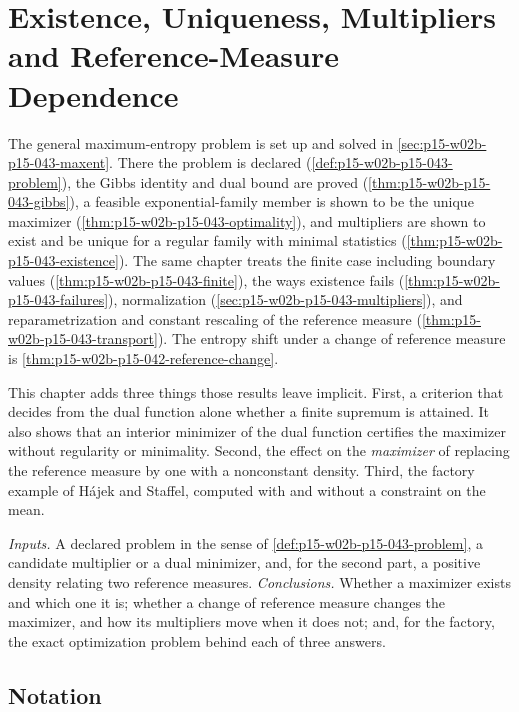 \chapter{Existence, Uniqueness, Multipliers and Reference-Measure Dependence}
\label{sec:p15-w02b-p15-044-maxent-existence}

The general maximum-entropy problem is set up and solved in
\cref{sec:p15-w02b-p15-043-maxent}. There the problem is declared
(\cref{def:p15-w02b-p15-043-problem}), the Gibbs identity and dual bound
are proved (\cref{thm:p15-w02b-p15-043-gibbs}), a feasible
exponential-family member is shown to be the unique maximizer
(\cref{thm:p15-w02b-p15-043-optimality}), and multipliers are shown to
exist and be unique for a regular family with minimal statistics
(\cref{thm:p15-w02b-p15-043-existence}). The same chapter treats the finite
case including boundary values (\cref{thm:p15-w02b-p15-043-finite}), the
ways existence fails (\cref{thm:p15-w02b-p15-043-failures}),
normalization (\cref{sec:p15-w02b-p15-043-multipliers}), and
reparametrization and constant rescaling of the reference measure
(\cref{thm:p15-w02b-p15-043-transport}). The entropy shift under a change
of reference measure is \cref{thm:p15-w02b-p15-042-reference-change}.

This chapter adds three things those results leave implicit. First, a
criterion that decides from the dual function alone whether a finite
supremum is attained. It also shows that an interior minimizer of the dual
function certifies the maximizer without regularity or minimality.
Second, the effect on the \emph{maximizer} of replacing the reference
measure by one with a nonconstant density. Third, the factory example of
H\'ajek and Staffel, computed with and without a constraint on the mean.

\emph{Inputs.} A declared problem in the sense of
\cref{def:p15-w02b-p15-043-problem}, a candidate multiplier or a dual
minimizer, and, for the second part, a positive density relating two
reference measures. \emph{Conclusions.} Whether a maximizer exists and
which one it is; whether a change of reference measure changes the
maximizer, and how its multipliers move when it does not; and, for the
factory, the exact optimization problem behind each of three answers.

\section{Notation}
\label{sec:p15-w02b-p15-044-notation}

